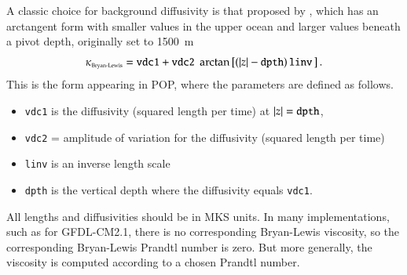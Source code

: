 A classic choice for background diffusivity is that proposed by
\cite{BryanLewis1979}, which has an arctangent form with smaller
values in the upper ocean and larger values beneath a pivot depth,
originally set to 1500~m
\begin{equation}
 \kappa_{\mbox{\tiny Bryan-Lewis}} = {\tt vdc1}
   + {\tt vdc2}  \;  \arctan\left[ ( |z| - {\tt dpth}) \,   {\tt linv}  \, \right].
\label{eq:bryan-lewis-function-pop}
\end{equation}
This is the form appearing in POP, where the parameters are defined as
follows.
\begin{itemize}

\item {\tt vdc1} is the diffusivity (squared length per time) at $|z|
  = {\tt dpth}$,

\item {\tt vdc2} = amplitude of variation for the diffusivity
  (squared length per time)

\item {\tt linv} is an inverse length scale 

\item {\tt dpth} is the vertical depth where the diffusivity equals
  {\tt vdc1}.

\end{itemize}
All lengths and diffusivities should be in MKS units.  In many
implementations, such as for GFDL-CM2.1, there is no corresponding
Bryan-Lewis viscosity, so the corresponding Bryan-Lewis Prandtl number
is zero.  But more generally, the viscosity is computed according to a
chosen Prandtl number.

